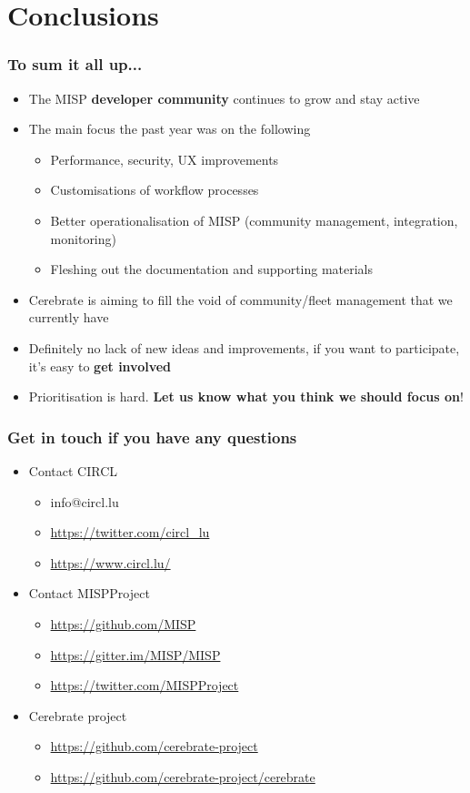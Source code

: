 \section{Conclusions}

\begin{frame}
  \frametitle{To sum it all up...}
  \begin{itemize}
     \item The MISP {\bf developer community} continues to grow and stay active
     \item The main focus the past year was on the following
     \begin{itemize}
          \item Performance, security, UX improvements
          \item Customisations of workflow processes
          \item Better operationalisation of MISP (community management, integration, monitoring)
          \item Fleshing out the documentation and supporting materials
     \end{itemize}
     \item Cerebrate is aiming to fill the void of community/fleet management that we currently have
     \item Definitely no lack of new ideas and improvements, if you want to participate, it's easy to {\bf get involved}
     \item Prioritisation is hard. {\bf Let us know what you think we should focus on}!
  \end{itemize}
\end{frame}

\begin{frame}
  \frametitle{Get in touch if you have any questions}
  \begin{itemize}
    \item Contact CIRCL
    \begin{itemize}
      \item info@circl.lu
      \item \url{https://twitter.com/circl_lu}
      \item \url{https://www.circl.lu/}
    \end{itemize}
    \item Contact MISPProject 
    \begin{itemize}
      \item \url{https://github.com/MISP}
      \item \url{https://gitter.im/MISP/MISP}
      \item \url{https://twitter.com/MISPProject}
    \end{itemize}
    \item Cerebrate project
    \begin{itemize}
      \item \url{https://github.com/cerebrate-project}
      \item \url{https://github.com/cerebrate-project/cerebrate}
    \end{itemize}
  \end{itemize}
\end{frame}
